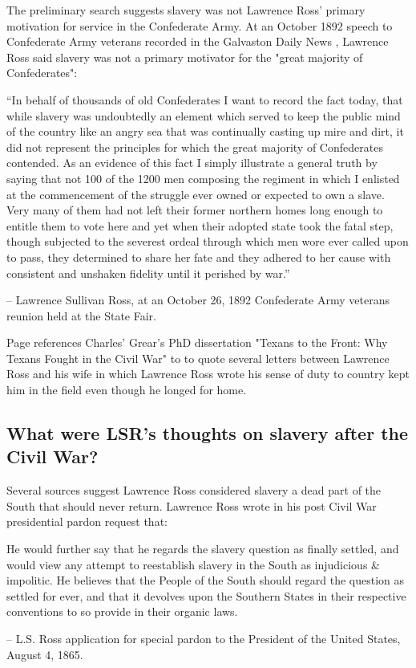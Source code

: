 \documentclass[12pt]{article}
\begin{document}
The preliminary search suggests slavery was not Lawrence Ross' primary motivation for service in the Confederate Army. At an October 1892 speech to Confederate Army veterans recorded in the Galvaston Daily News \cite{galvastondaily}, Lawrence Ross said slavery was not a primary motivator for the "great majority of Confederates":

\begin{displayquote}
“In behalf of thousands of old Confederates I want to record the fact today, that while slavery was undoubtedly an element which served to keep the public mind of the country like an angry sea that was continually casting up mire and dirt, it did not represent the principles for which the great majority of Confederates contended.  As an evidence of this fact I simply illustrate a general truth by saying that not 100 of the 1200 men composing the regiment in which I enlisted at the commencement of the struggle ever owned or expected to own a slave.  Very many of them had not left their former northern homes long enough to entitle them to vote here and yet when their adopted state took the fatal step, though subjected to the severest ordeal through which men wore ever called upon to pass, they determined to share her fate and they adhered to her cause with consistent and unshaken fidelity until it perished by war.” 

-- Lawrence Sullivan Ross, at an October 26, 1892 Confederate Army veterans reunion held at the State Fair.
\end{displayquote}

Page \cite[pg. 59--60]{page} references Charles' Grear's PhD dissertation "Texans to the Front: Why Texans Fought in the Civil War" to to quote several letters between Lawrence Ross and his wife in which Lawrence Ross wrote his sense of duty to country kept him in the field even though he longed for home. 

\subsection{What were LSR's thoughts on slavery after the Civil War?}
Several sources suggest Lawrence Ross considered slavery a dead part of the South that should never return. Lawrence Ross wrote in his post Civil War presidential pardon request \cite{pardonrequest} that:

\begin{displayquote}
He would further say that he regards the slavery question as finally settled, and would view any attempt to reestablish slavery in the South as injudicious \& impolitic.  He believes that the People of the South should regard the question as settled for ever, and that it devolves upon the Southern States in their respective conventions to so provide in their organic laws.

-- L.S. Ross application for special pardon to the President of the United States, August 4, 1865.
\end{displayquote}
\end{document}
